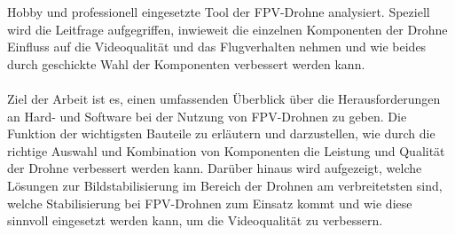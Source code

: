     Hobby und professionell eingesetzte Tool der FPV-Drohne analysiert. Speziell wird die Leitfrage
    aufgegriffen, inwieweit die einzelnen Komponenten der Drohne Einfluss auf die Videoqualität
    und das Flugverhalten nehmen und wie beides durch geschickte Wahl der Komponenten verbessert werden kann.\\
    \\
    Ziel der Arbeit ist es, einen umfassenden Überblick über die Herausforderungen an Hard- und Software bei
    der Nutzung von FPV-Drohnen zu geben. Die Funktion der wichtigsten Bauteile zu erläutern und darzustellen,
    wie durch die richtige Auswahl und Kombination von Komponenten die Leistung und Qualität der Drohne verbessert
    werden kann. Darüber hinaus wird aufgezeigt, welche Lösungen zur Bildstabilisierung im Bereich der Drohnen am
    verbreitetsten sind, welche Stabilisierung bei FPV-Drohnen zum Einsatz kommt und wie diese sinnvoll eingesetzt
    werden kann, um die Videoqualität zu verbessern.